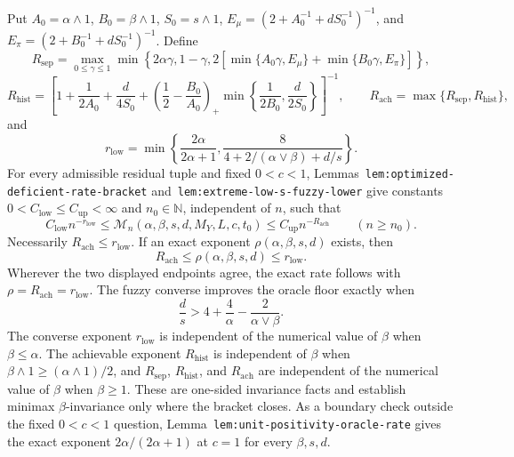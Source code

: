 Put \(A_0=\alpha\wedge1\), \(B_0=\beta\wedge1\), \(S_0=s\wedge1\), \(E_\mu=(2+A_0^{-1}+dS_0^{-1})^{-1}\), and \(E_\pi=(2+B_0^{-1}+dS_0^{-1})^{-1}\). Define
\[
R_{\mathrm{sep}}=
\max_{0\le\gamma\le1}
\min\left\{
2\alpha\gamma,
1-\gamma,
2\left[\min\{A_0\gamma,E_\mu\}+\min\{B_0\gamma,E_\pi\}\right]
\right\},
\]
\[
R_{\mathrm{hist}}=
\left[
1+\frac1{2A_0}+\frac d{4S_0}
+\left(\frac12-\frac{B_0}{A_0}\right)_+
\min\left\{\frac1{2B_0},\frac d{2S_0}\right\}
\right]^{-1},
\qquad
R_{\mathrm{ach}}=\max\{R_{\mathrm{sep}},R_{\mathrm{hist}}\},
\]
and
\[
r_{\mathrm{low}}=
\min\left\{
\frac{2\alpha}{2\alpha+1},
\frac{8}{4+2/(\alpha\vee\beta)+d/s}
\right\}.
\]
For every admissible residual tuple and fixed \(0<c<1\), Lemmas~\texttt{lem:optimized-deficient-rate-bracket} and~\texttt{lem:extreme-low-s-fuzzy-lower} give constants \(0<C_{\mathrm{low}}\le C_{\mathrm{up}}<\infty\) and \(n_0\in\mathbb N\), independent of \(n\), such that
\[
C_{\mathrm{low}}n^{-r_{\mathrm{low}}}
\le
\mathcal M_n(\alpha,\beta,s,d,M_Y,L,c,t_0)
\le
C_{\mathrm{up}}n^{-R_{\mathrm{ach}}}
\qquad(n\ge n_0).
\]
Necessarily \(R_{\mathrm{ach}}\le r_{\mathrm{low}}\). If an exact exponent \(\rho(\alpha,\beta,s,d)\) exists, then
\[
R_{\mathrm{ach}}\le\rho(\alpha,\beta,s,d)\le r_{\mathrm{low}}.
\]
Wherever the two displayed endpoints agree, the exact rate follows with \(\rho=R_{\mathrm{ach}}=r_{\mathrm{low}}\). The fuzzy converse improves the oracle floor exactly when
\[
\frac ds>4+\frac4\alpha-\frac{2}{\alpha\vee\beta}.
\]
The converse exponent \(r_{\mathrm{low}}\) is independent of the numerical value of \(\beta\) when \(\beta\le\alpha\). The achievable exponent \(R_{\mathrm{hist}}\) is independent of \(\beta\) when \(\beta\wedge1\ge(\alpha\wedge1)/2\), and \(R_{\mathrm{sep}}\), \(R_{\mathrm{hist}}\), and \(R_{\mathrm{ach}}\) are independent of the numerical value of \(\beta\) when \(\beta\ge1\). These are one-sided invariance facts and establish minimax \(\beta\)-invariance only where the bracket closes. As a boundary check outside the fixed \(0<c<1\) question, Lemma~\texttt{lem:unit-positivity-oracle-rate} gives the exact exponent \(2\alpha/(2\alpha+1)\) at \(c=1\) for every \(\beta,s,d\).